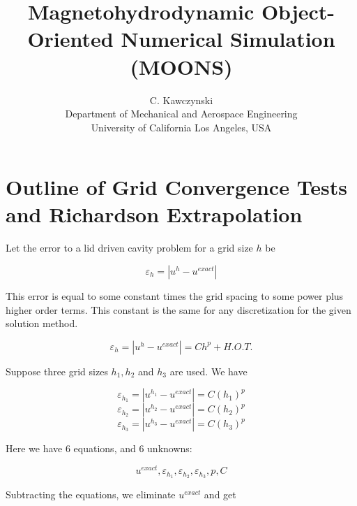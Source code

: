 \documentclass[11pt]{article}
\begin{document}
\doublespacing
\title{Magnetohydrodynamic Object-Oriented Numerical Simulation (MOONS)}
\author{C. Kawczynski \\
Department of Mechanical and Aerospace Engineering \\
University of California Los Angeles, USA\\
}
\maketitle



\section{Outline of Grid Convergence Tests and Richardson Extrapolation}

Let the error to a lid driven cavity problem for a grid size $h$ be

\begin{equation}
	\varepsilon_{h} = |u^{h} - u^{exact}|
\end{equation}

This error is equal to some constant times the grid spacing to some power plus higher order terms. This constant is the same for any discretization for the given solution method.

\begin{equation}
	\varepsilon_{h} 
	=
	|u^{h} - u^{exact}|
	=
	C h^p + H.O.T.
\end{equation}

Suppose three grid sizes $h_1,h_2$ and $h_3$ are used. We have

\begin{equation}
	\varepsilon_{h_1} = |u^{h_1} - u^{exact}| = C (h_1)^p
\end{equation}
\begin{equation}
	\varepsilon_{h_2} = |u^{h_2} - u^{exact}| = C (h_2)^p
\end{equation}
\begin{equation}
	\varepsilon_{h_3} = |u^{h_3} - u^{exact}| = C (h_3)^p
\end{equation}

Here we have 6 equations, and 6 unknowns:

\begin{equation}
	u^{exact}, 
	\varepsilon_{h_1} , 
	\varepsilon_{h_2} , 
	\varepsilon_{h_3} , 
	p , 
	C
\end{equation}

Subtracting the equations, we eliminate $u^{exact}$ and get
\end{document}
